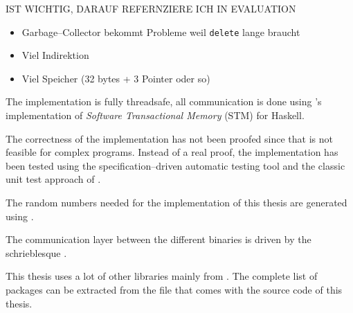 \begin{JWtodoBox}

  IST WICHTIG, DARAUF REFERNZIERE ICH IN EVALUATION

  \begin{itemize}

    \item Garbage--Collector bekommt Probleme weil \texttt{delete} lange braucht

    \item Viel Indirektion

    \item Viel Speicher (32 bytes + 3 Pointer oder so)

  \end{itemize}

\end{JWtodoBox}



The implementation is fully threadsafe, all communication is done using
\JWTghc{}'s implementation of \emph{Software Transactional Memory} (STM)
\cite{stm05} for Haskell.



The correctness of the implementation has not been proofed since that is not
feasible for complex programs. Instead of a real proof, the implementation
has been tested using the specification--driven automatic \JWThaskell{} testing
tool \JWTquickcheck{} \cite{quickcheck} and the classic unit test approach of
\JWTLhunit{}.



The random numbers needed for the implementation of this thesis are generated
using \JWTLmonadcryptorandom{}.



The communication layer between the different binaries is driven by the
schrieblesque \JWTXLprotobuf{}.



This thesis uses a lot of other libraries mainly from \JWTLhackage{}. The
complete list of packages can be extracted from the file
 that comes with the source code of this thesis.


\label{sec:src-org}

